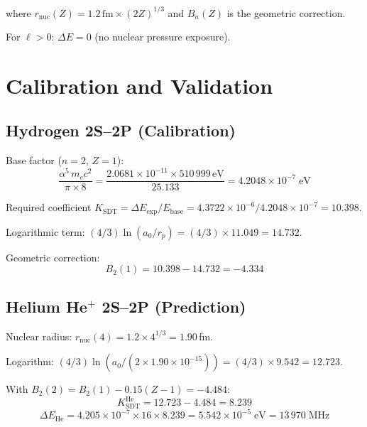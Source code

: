 where $r_{\text{nuc}}(Z) = 1.2\,\text{fm} \times (2Z)^{1/3}$ and $B_n(Z)$ is the geometric correction.

For $\ell > 0$: $\Delta E = 0$ (no nuclear pressure exposure).


\section{Calibration and Validation}

\subsection{Hydrogen 2S--2P (Calibration)}

Base factor ($n=2$, $Z=1$):
\begin{equation}
  \frac{\alpha^5\,m_e c^2}{\pi \times 8}
    = \frac{2.0681 \times 10^{-11} \times 510\,999\,\text{eV}}{25.133}
    = 4.2048 \times 10^{-7}\;\text{eV}
\end{equation}

Required coefficient $K_{\text{SDT}} = \Delta E_{\exp}/E_{\text{base}} = 4.3722 \times 10^{-6} / 4.2048 \times 10^{-7} = 10.398$.

Logarithmic term: $(4/3)\ln(a_0/r_p) = (4/3) \times 11.049 = 14.732$.

Geometric correction:
\begin{equation}
  B_2(1) = 10.398 - 14.732 = -4.334
\end{equation}

\subsection{Helium He$^+$ 2S--2P (Prediction)}

Nuclear radius: $r_{\text{nuc}}(4) = 1.2 \times 4^{1/3} = 1.90$\,fm.

Logarithm: $(4/3)\ln(a_0/(2 \times 1.90 \times 10^{-15})) = (4/3) \times 9.542 = 12.723$.

With $B_2(2) = B_2(1) - 0.15(Z-1) = -4.484$:
\begin{equation}
  K_{\text{SDT}}^{\text{He}} = 12.723 - 4.484 = 8.239
\end{equation}
\begin{equation}
  \Delta E_{\text{He}} = 4.205 \times 10^{-7} \times 16 \times 8.239
    = 5.542 \times 10^{-5}\;\text{eV} = 13\,970\;\text{MHz}
\end{equation}

